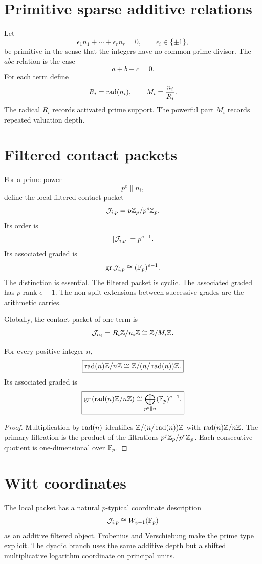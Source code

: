 \section{Primitive sparse additive relations}
Let
\[
\epsilon_1n_1+\cdots+\epsilon_rn_r=0,
\qquad
\epsilon_i\in\{\pm1\},
\]
be primitive in the sense that the integers have no common prime divisor. The $abc$ relation is the case
\[
a+b-c=0.
\]
For each term define
\[
R_i=\operatorname{rad}(n_i),
\qquad
M_i=\frac{n_i}{R_i}.
\]
The radical $R_i$ records activated prime support. The powerful part $M_i$ records repeated valuation depth.

\section{Filtered contact packets}
For a prime power
\[
p^e\parallel n_i,
\]
define the local filtered contact packet
\[
\mathcal J_{i,p}=p\mathbb Z_p/p^e\mathbb Z_p.
\]
Its order is
\[
\left|\mathcal J_{i,p}\right|=p^{e-1}.
\]
Its associated graded is
\[
\operatorname{gr}\mathcal J_{i,p}\cong(\mathbb F_p)^{e-1}.
\]
The distinction is essential. The filtered packet is cyclic. The associated graded has $p$-rank $e-1$. The non-split extensions between successive grades are the arithmetic carries.

Globally, the contact packet of one term is
\[
\mathcal J_{n_i}
=
R_i\mathbb Z/n_i\mathbb Z
\cong
\mathbb Z/M_i\mathbb Z.
\]

\begin{theorem}
For every positive integer $n$,
\[
\boxed{
\operatorname{rad}(n)\mathbb Z/n\mathbb Z
\cong
\mathbb Z/(n/\operatorname{rad}(n))\mathbb Z.
}
\]
Its associated graded is
\[
\boxed{
\operatorname{gr}\left(\operatorname{rad}(n)\mathbb Z/n\mathbb Z\right)
\cong
\bigoplus_{p^e\parallel n}(\mathbb F_p)^{e-1}.
}
\]
\end{theorem}

\begin{proof}
Multiplication by $\operatorname{rad}(n)$ identifies $\mathbb Z/(n/\operatorname{rad}(n))\mathbb Z$ with $\operatorname{rad}(n)\mathbb Z/n\mathbb Z$. The primary filtration is the product of the filtrations $p^j\mathbb Z_p/p^e\mathbb Z_p$. Each consecutive quotient is one-dimensional over $\mathbb F_p$.
\end{proof}

\section{Witt coordinates}
The local packet has a natural $p$-typical coordinate description
\[
\mathcal J_{i,p}
\cong
W_{e-1}(\mathbb F_p)
\]
as an additive filtered object. Frobenius and Verschiebung make the prime type explicit. The dyadic branch uses the same additive depth but a shifted multiplicative logarithm coordinate on principal units.

